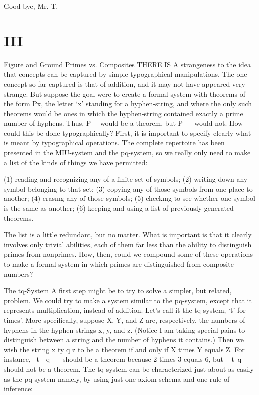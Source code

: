 \achilles Good-bye, Mr. T.\par









\chapter {III}


Figure and Ground Primes vs. Composites THERE IS A strangeness to the idea that concepts can be captured by simple typographical manipulations. The one concept so far captured is that of addition, and it may not have appeared very strange. But suppose the goal were to create a formal system with theorems of the form Px, the letter `x' standing for a hyphen-string, and where the only such theorems would be ones in which the hyphen-string contained exactly a prime number of hyphens. Thus, P--- would be a theorem, but P---- would not. How could this be done typographically? First, it is important to specify clearly what is meant by typographical operations. The complete repertoire has been presented in the MIU-system and the pq-system, so we really only need to make a list of the kinds of things we have permitted: 

(1) reading and recognizing any of a finite set of symbols; (2) writing down any symbol belonging to that set; (3) copying any of those symbols from one place to another; (4) erasing any of those symbols; (5) checking to see whether one symbol is the same as another; (6) keeping and using a list of previously generated theorems. 

The list is a little redundant, but no matter. What is important is that it clearly involves only trivial abilities, each of them far less than the ability to distinguish primes from nonprimes. How, then, could we compound some of these operations to make a formal system in which primes are distinguished from composite numbers? 

The tq-System A first step might be to try to solve a simpler, but related, problem. We could try to make a system similar to the pq-system, except that it represents multiplication, instead of addition. Let's call it the tq-system, `t' for times'. More specifically, suppose X, Y, and Z are, respectively, the numbers of hyphens in the hyphen-strings x, y, and z. (Notice I am taking special pains to distinguish between a string and the number of hyphens it contains.) Then we wish the string x ty q z to be a theorem if and only if X times Y equals Z. For instance, --t---q----- should be a theorem because 2 times 3 equals 6, but -- t--q--- should not be a theorem. The tq-system can be characterized just about as easily as the pq-system namely, by using just one axiom schema and one rule of inference: 







